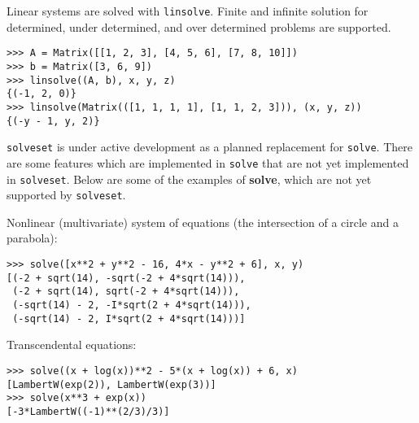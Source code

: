 Linear systems are solved with \texttt{linsolve}. Finite and infinite solution for determined, under
determined, and over determined problems are supported.
\begin{verbatim}
>>> A = Matrix([[1, 2, 3], [4, 5, 6], [7, 8, 10]])
>>> b = Matrix([3, 6, 9])
>>> linsolve((A, b), x, y, z)
{(-1, 2, 0)}
>>> linsolve(Matrix(([1, 1, 1, 1], [1, 1, 2, 3])), (x, y, z))
{(-y - 1, y, 2)}
\end{verbatim}

\texttt{solveset} is under active development as a planned replacement for
\texttt{solve}. There are some features which are implemented in
\texttt{solve} that are not yet implemented in \texttt{solveset}. Below are
some of the examples of \textbf{solve}, which are not yet supported by
\texttt{solveset}.

\noindent Nonlinear (multivariate) system of equations (the intersection of a circle
and a parabola):
\begin{verbatim}
>>> solve([x**2 + y**2 - 16, 4*x - y**2 + 6], x, y)
[(-2 + sqrt(14), -sqrt(-2 + 4*sqrt(14))),
 (-2 + sqrt(14), sqrt(-2 + 4*sqrt(14))),
 (-sqrt(14) - 2, -I*sqrt(2 + 4*sqrt(14))),
 (-sqrt(14) - 2, I*sqrt(2 + 4*sqrt(14)))]
\end{verbatim}

\noindent Transcendental equations:
\begin{verbatim}
>>> solve((x + log(x))**2 - 5*(x + log(x)) + 6, x)
[LambertW(exp(2)), LambertW(exp(3))]
>>> solve(x**3 + exp(x))
[-3*LambertW((-1)**(2/3)/3)]
\end{verbatim}
